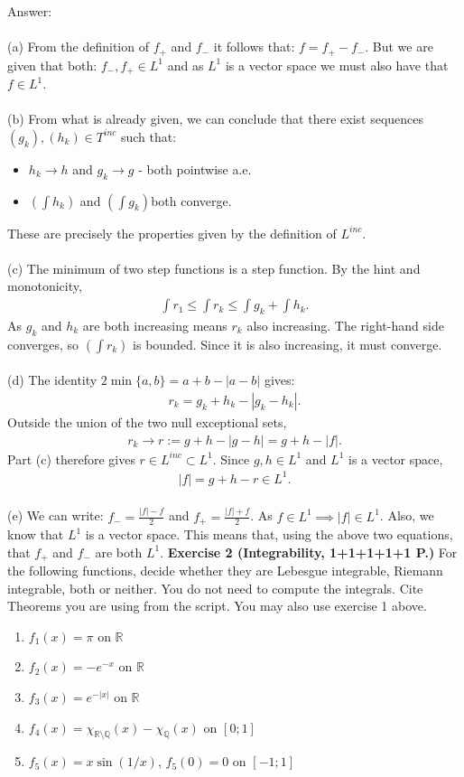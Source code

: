 \documentclass[12pt,a4paper]{article}
\begin{document}
\vspace{1cm}
\noindent
Answer:\\
\\
(a) From the definition of $f_+$ and $f_-$ it follows that: $f = f_+ - f_-$.  But we are given that both: $f_-, f_+ \in L^1$ and as $L^1$
is a vector space we must also have that $f \in L^1$.\\
\\
(b) From what is already given, we can conclude that there exist sequences $(g_k), (h_k) \in T^{inc}$ such that:
\begin{itemize}
\item $h_k \to h$ and $g_k \to g$ - both pointwise a.e.
\item $(\int h_k)$ and $(\int g_k)$both converge.
\end{itemize}
These are precisely the properties given by the definition of $L^{inc}$.\\
\\
(c) The minimum of two step functions is a step function.  By the hint and monotonicity,
\begin{align*}
\int r_1 \leq \int r_k
\leq \int g_k+\int h_k.
\end{align*}
As $g_k$ and $h_k$ are both increasing means $r_k$ also increasing.  The right-hand side 
converges, so $(\int r_k)$ is bounded. Since it is also increasing, it must converge.\\
\\
(d) The identity $2\min\{a,b\} = a+b-|a-b|$ gives:
\begin{align*}
r_k=g_k+h_k-|g_k-h_k|.
\end{align*}
Outside the union of the two null exceptional sets,
\begin{align*}
r_k\longrightarrow r:=g+h-|g-h|=g+h-|f|.
\end{align*}
Part (c) therefore gives $r \in L^{inc} \subset L^1$. Since $g,h \in L^1$ and $L^1$ is a vector space,
\begin{align*}
|f|=g+h-r\in L^1.
\end{align*}
\\
(e) We can write: $f_- = \frac{|f| - f}{2}$ and $f_+ = \frac{|f| + f}{2}$.  As $f \in L^1 \implies |f| \in L^1$.  Also, we know that $L^1$ is
a vector space.  This means that, using the above two equations, that $f_+$ and $f_-$ are both $L^1$. 
\newpage
\textbf{Exercise 2 (Integrability, 1+1+1+1+1 P.)}
For the following functions, decide whether they are Lebesgue integrable, Riemann integrable, both or neither. You do not need to compute the integrals. Cite Theorems you are using from the script. You may also use exercise 1 above.
\begin{enumerate}
\item[(a)] $f_1(x)=\pi$ on $\mathbb{R}$
\item[(b)] $f_2(x)=-e^{-x}$ on $\mathbb{R}$
\item[(c)] $f_3(x)=e^{-|x|}$ on $\mathbb{R}$
\item[(d)] $f_4(x)=\chi_{\mathbb{R}\setminus\mathbb{Q}}(x)-\chi_{\mathbb{Q}}(x)$ on $[0;1]$
\item[(e)] $f_5(x)=x\sin(1/x)$, $f_5(0)=0$ on $[-1;1]$
\end{enumerate}
\end{document}
